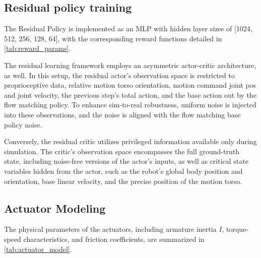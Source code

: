 \subsection{Residual policy training}
The Residual Policy is implemented as an MLP with hidden layer sizes of [1024, 512, 256, 128, 64], with the corresponding reward functions detailed in \cref{tab:reward_params}.

The residual learning framework employs an asymmetric actor-critic architecture, as well. In this setup, the residual actor's observation space is restricted to proprioceptive data, relative motion torso orientation, motion command joint pos and joint velocity, the previous step's total action, and the base action out by the flow matching policy. To enhance sim-to-real robustness, uniform noise is injected into these observations, and the noise is aligned with the flow matching base policy noise. 

Conversely, the residual critic utilizes privileged information available only during simulation. The critic's observation space encompasses the full ground-truth state, including noise-free versions of the actor's inputs, as well as critical state variables hidden from the actor, such as the robot's global body position and orientation, base linear velocity, and the precise position of the motion torso.



\subsection{Actuator Modeling}
The physical parameters of the actuators, including armature inertia $I$, torque-speed characteristics, and friction coefficients, are summarized in \cref{tab:actuator_model}.

